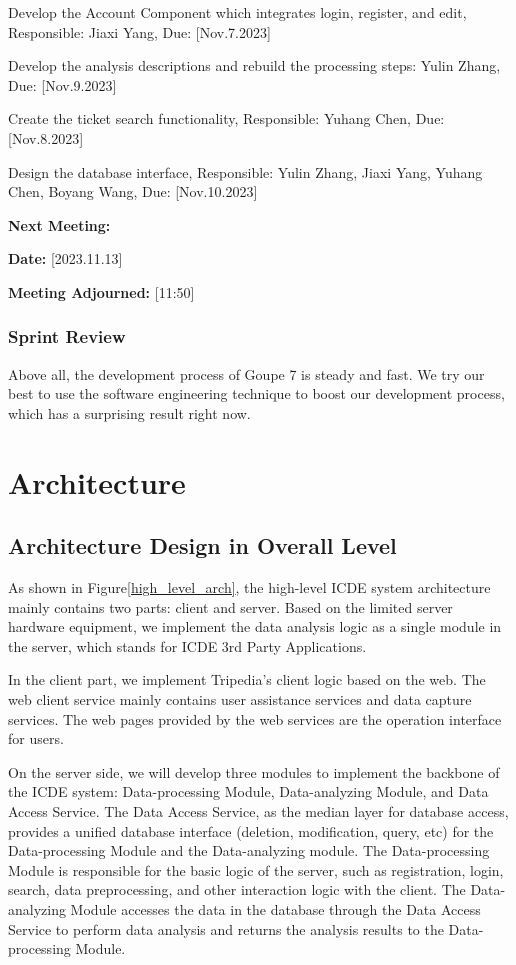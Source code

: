 \documentclass[conference]{IEEEtran}
\begin{document}
Develop the Account Component which integrates login, register, and edit, Responsible: Jiaxi Yang, Due: [Nov.7.2023]

Develop the analysis descriptions and rebuild the processing steps: Yulin Zhang, Due: [Nov.9.2023]

Create the ticket search functionality, Responsible: Yuhang Chen, Due: [Nov.8.2023]

Design the database interface, Responsible: Yulin Zhang, Jiaxi Yang, Yuhang Chen, Boyang Wang, Due: [Nov.10.2023]

\textbf{Next Meeting:}

\textbf{Date:} [2023.11.13]

\textbf{Meeting Adjourned:} [11:50]



\subsubsection{\textbf{Sprint Review}}



Above all, the development process of Goupe 7 is steady and fast. We try our best to use the software engineering technique to boost our development process, which has a surprising result right now.


\section{\textbf{Architecture}}


\subsection{\textbf{Architecture Design in Overall Level}}

As shown in Figure\ref{high_level_arch}, the high-level ICDE system architecture mainly contains two parts: client and server. Based on the limited server hardware equipment, we implement the data analysis logic as a single module in the server, which stands for ICDE 3rd Party Applications. 

In the client part, we implement Tripedia's client logic based on the web. The web client service mainly contains user assistance services and data capture services. The web pages provided by the web services are the operation interface for users.

On the server side, we will develop three modules to implement the backbone of the ICDE system: Data-processing Module, Data-analyzing Module, and Data Access Service. The Data Access Service, as the median layer for database access, provides a unified database interface (deletion, modification, query, etc) for the Data-processing Module and the Data-analyzing module. The Data-processing Module is responsible for the basic logic of the server, such as registration, login, search, data preprocessing, and other interaction logic with the client. The Data-analyzing Module accesses the data in the database through the Data Access Service to perform data analysis and returns the analysis results to the Data-processing Module.
\end{document}
